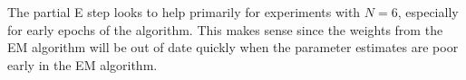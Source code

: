The partial E step looks to help primarily for experiments with $N=6$, especially for early epochs of the algorithm. This makes sense since the weights from the EM algorithm will be out of date quickly when the parameter estimates are poor early in the EM algorithm.


